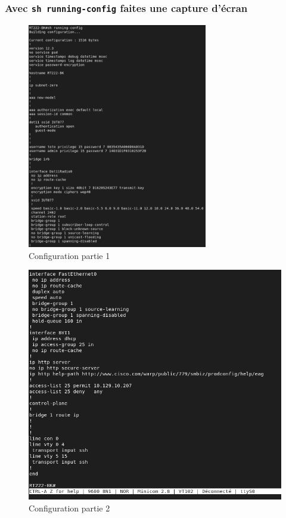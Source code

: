 \documentclass[12pt, a4paper]{article}
\begin{document}
        \subsubsection{Avec \texttt{sh running-config} faites une capture d'écran}
        \begin{figure}[H]
            \centering
            \includegraphics[width=0.7\textwidth]{img/config-part1.png}
            \caption{Configuration partie 1}
            \label{fig:conf1}
        \end{figure}
        \begin{figure}[H]
            \centering
            \includegraphics[width=1\textwidth]{img/config-part2.png}
            \caption{Configuration partie 2}
            \label{fig:conf2}
        \end{figure}
\end{document}
